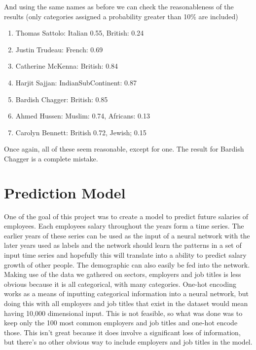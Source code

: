 \documentclass{article}
\begin{document}
And using the same names as before we can check the reasonableness of the results
(only categories assigned a probability greater than 10\% are included)


\begin{enumerate}
    \item Thomas Sattolo:  Italian 0.55, British: 0.24
    \item Justin Trudeau: French: 0.69
    \item Catherine McKenna: British: 0.84
    \item Harjit Sajjan: IndianSubContinent: 0.87
    \item Bardish Chagger: British: 0.85
    \item Ahmed Hussen: Muslim: 0.74, Africans: 0.13
    \item Carolyn Bennett: British 0.72, Jewish; 0.15
\end{enumerate}

Once again, all of these seem reasonable, except for one. The result for Bardish
Chagger is a complete mistake.

\section{Prediction Model}

One of the goal of this project was to create a model to predict future
salaries of employees. Each employees salary throughout the years form a time
series.  The earlier years of these series can be used as the input of a neural
network with the later years used as labels and the network should learn the
patterns in a set of input time series and hopefully this will translate into a
ability to predict salary growth of other people. The demographic can also
easily be fed into the network. Making use of the data we gathered on sectors,
employers and job titles is less obvious because it is all categorical, with
many categories. One-hot encoding works as a means of inputting categorical
information into a neural network, but doing this with all employers and job
titles that exist in the dataset would mean having 10,000 dimensional input.
This is not feasible, so what was done was to keep only the 100 most common
employers and job titles and one-hot encode those. This isn't great because it
does involve a significant loss of information, but there's no other obvious
way to include employers and job titles in the model.
\end{document}
